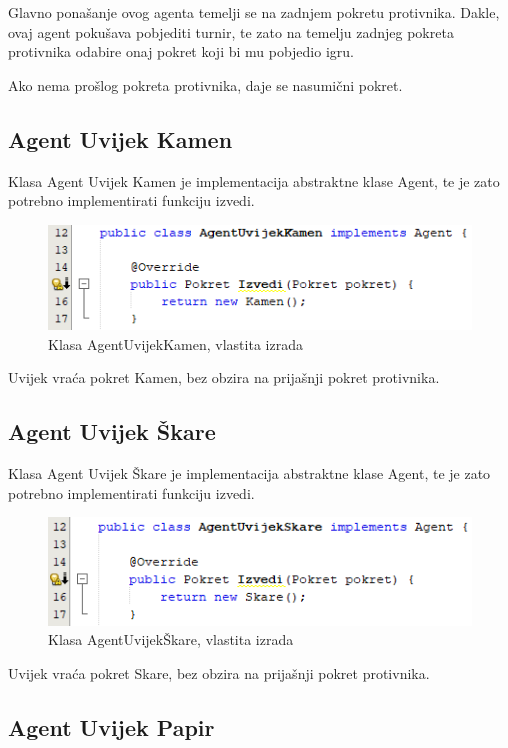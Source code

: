\documentclass{foi}
\begin{document}
Glavno ponašanje ovog agenta temelji se na zadnjem pokretu protivnika. Dakle, ovaj agent pokušava pobjediti turnir, te zato na temelju zadnjeg pokreta protivnika odabire onaj pokret koji bi mu pobjedio igru.

Ako nema prošlog pokreta protivnika, daje se nasumični pokret.
\clearpage
\subsection{Agent Uvijek Kamen}
Klasa Agent Uvijek Kamen je implementacija abstraktne klase Agent, te je zato potrebno implementirati funkciju izvedi.
\begin{figure}[h!]
    \centering
    \includegraphics[scale=0.7]{slike/Screenshot_8.png}
    \caption{Klasa AgentUvijekKamen, vlastita izrada}
\end{figure}

Uvijek vraća pokret Kamen, bez obzira na prijašnji pokret protivnika.


\subsection{Agent Uvijek Škare}

Klasa Agent Uvijek Škare je implementacija abstraktne klase Agent, te je zato potrebno implementirati funkciju izvedi.

\begin{figure}[h!]
    \centering
    \includegraphics[scale=0.7]{slike/Screenshot_10.png}
    \caption{Klasa AgentUvijekŠkare, vlastita izrada}
\end{figure}

Uvijek vraća pokret Skare, bez obzira na prijašnji pokret protivnika.


\subsection{Agent Uvijek Papir}
\end{document}
